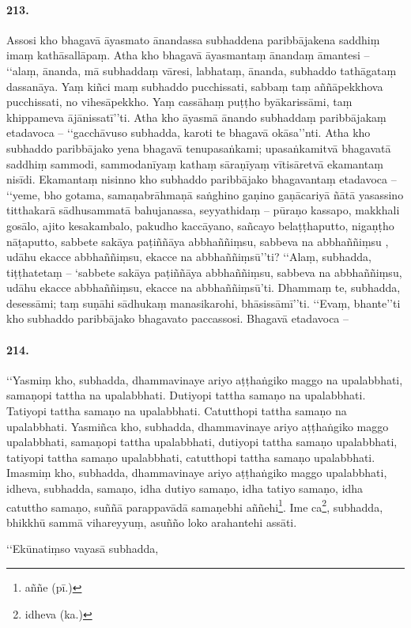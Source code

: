 \paragraph{213.} Assosi kho bhagavā āyasmato ānandassa subhaddena paribbājakena saddhiṃ imaṃ kathāsallāpaṃ. Atha kho bhagavā āyasmantaṃ ānandaṃ āmantesi – ‘‘alaṃ, ānanda, mā subhaddaṃ vāresi, labhataṃ, ānanda, subhaddo tathāgataṃ dassanāya. Yaṃ kiñci maṃ subhaddo pucchissati, sabbaṃ taṃ aññāpekkhova pucchissati, no vihesāpekkho. Yaṃ cassāhaṃ puṭṭho byākarissāmi, taṃ khippameva ājānissatī’’ti. Atha kho āyasmā ānando subhaddaṃ paribbājakaṃ etadavoca – ‘‘gacchāvuso subhadda, karoti te bhagavā okāsa’’nti. Atha kho subhaddo paribbājako yena bhagavā tenupasaṅkami; upasaṅkamitvā bhagavatā saddhiṃ sammodi, sammodanīyaṃ kathaṃ sāraṇīyaṃ vītisāretvā ekamantaṃ nisīdi. Ekamantaṃ nisinno kho subhaddo paribbājako bhagavantaṃ etadavoca – ‘‘yeme, bho gotama, samaṇabrāhmaṇā saṅghino gaṇino gaṇācariyā ñātā yasassino titthakarā sādhusammatā bahujanassa, seyyathidaṃ – pūraṇo kassapo, makkhali gosālo, ajito kesakambalo, pakudho kaccāyano, sañcayo belaṭṭhaputto, nigaṇṭho nāṭaputto, sabbete sakāya paṭiññāya abbhaññiṃsu, sabbeva na abbhaññiṃsu , udāhu ekacce abbhaññiṃsu, ekacce na abbhaññiṃsū’’ti? ‘‘Alaṃ, subhadda, tiṭṭhatetaṃ – ‘sabbete sakāya paṭiññāya abbhaññiṃsu, sabbeva na abbhaññiṃsu, udāhu ekacce abbhaññiṃsu, ekacce na abbhaññiṃsū’ti. Dhammaṃ te, subhadda, desessāmi; taṃ suṇāhi sādhukaṃ manasikarohi, bhāsissāmī’’ti. ‘‘Evaṃ, bhante’’ti kho subhaddo paribbājako bhagavato paccassosi. Bhagavā etadavoca –

\paragraph{214.} ‘‘Yasmiṃ kho, subhadda, dhammavinaye ariyo aṭṭhaṅgiko maggo na upalabbhati, samaṇopi tattha na upalabbhati. Dutiyopi tattha samaṇo na upalabbhati. Tatiyopi tattha samaṇo na upalabbhati. Catutthopi tattha samaṇo na upalabbhati. Yasmiñca kho, subhadda, dhammavinaye ariyo aṭṭhaṅgiko maggo upalabbhati, samaṇopi tattha upalabbhati, dutiyopi tattha samaṇo upalabbhati, tatiyopi tattha samaṇo upalabbhati, catutthopi tattha samaṇo upalabbhati. Imasmiṃ kho, subhadda, dhammavinaye ariyo aṭṭhaṅgiko maggo upalabbhati, idheva, subhadda, samaṇo, idha dutiyo samaṇo, idha tatiyo samaṇo, idha catuttho samaṇo, suññā parappavādā samaṇebhi aññehi\footnote{aññe (pī.)}. Ime ca\footnote{idheva (ka.)}, subhadda, bhikkhū sammā vihareyyuṃ, asuñño loko arahantehi assāti.

‘‘Ekūnatiṃso vayasā subhadda,

